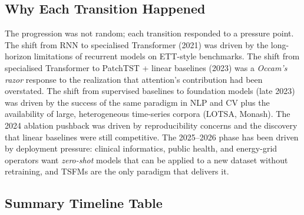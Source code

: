 \documentclass{article}
\begin{document}
\subsection{Why Each Transition Happened}\label{why-each-transition-happened}

The progression was not random; each transition responded to a pressure point. The shift from RNN to specialised Transformer (2021) was driven by the long-horizon limitations of recurrent models on ETT-style benchmarks. The shift from specialised Transformer to PatchTST + linear baselines (2023) was a \emph{Occam's razor} response to the realization that attention's contribution had been overstated. The shift from supervised baselines to foundation models (late 2023) was driven by the success of the same paradigm in NLP and CV plus the availability of large, heterogeneous time-series corpora (LOTSA, Monash). The 2024 ablation pushback was driven by reproducibility concerns and the discovery that linear baselines were still competitive. The 2025--2026 phase has been driven by deployment pressure: clinical informatics, public health, and energy-grid operators want \emph{zero-shot} models that can be applied to a new dataset without retraining, and TSFMs are the only paradigm that delivers it.

\subsection{Summary Timeline Table}\label{summary-timeline-table}
\end{document}

